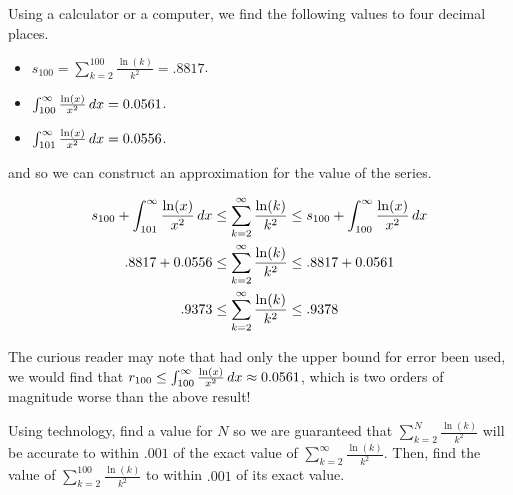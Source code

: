 \documentclass{ximera}
\begin{document}
\begin{example}
\begin{explanation}
%
%
%
%
%
%
%
Using a calculator or a computer, we find the following values to four decimal places.

\begin{itemize}
\item $s_{100} = \sum_{k=2}^{100} \frac{\ln(k)}{k^2} = .8817$.
\item $\int_{100}^\infty \frac{\ln(x)}{x^2} \mathop{}\!d x = 0.0561$.
\item $\int_{101}^\infty \frac{\ln(x)}{x^2} \mathop{}\!d x = 0.0556$.
\end{itemize}

and so we can construct an approximation for the value of the series.

\begin{align*}
s_{100} + \int_{101}^\infty \frac{\ln(x)}{x^2} \mathop{}\!d x & \leq   \sum_{k=2}^{\infty} \frac{\ln(k)}{k^2} \leq s_{100} + \int_{100}^\infty \frac{\ln(x)}{x^2} \mathop{}\!d x \\
.8817 + 0.0556 & \leq  \sum_{k=2}^{\infty} \frac{\ln(k)}{k^2} \leq .8817 + 0.0561 \\
.9373 & \leq  \sum_{k=2}^{\infty} \frac{\ln(k)}{k^2} \leq .9378
\end{align*}

\begin{remark}
The curious reader may note that had only the upper bound for error been used, we would find that $r_{100} \leq \int_{100}^{\infty} \frac{\ln(x)}{x^2} \mathop{}\!d x \approx 0.0561$, which is two orders of magnitude worse than the above result!
\end{remark}


\end{explanation}


\begin{example}
Using technology, find a value for $N$ so we are guaranteed that  $\sum_{k=2}^{N}  \frac{\ln(k)}{k^2}$ will be accurate to within $.001$ of the exact value of $\sum_{k=2}^{\infty}  \frac{\ln(k)}{k^2}$.  Then, find the value of $\sum_{k=2}^{100} \frac{\ln(k)}{k^2}$ to within $.001$ of its exact value.


\end{example}
\end{example}
\end{document}
